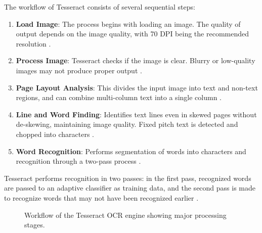 The workflow of Tesseract consists of several sequential steps:
\begin{enumerate}
	\item \textbf{Load Image}: The process begins with loading an image. The quality of output depends on the image quality, with 70 DPI being the recommended resolution \cite {Joshi:2021}.
	\item \textbf{Process Image}: Tesseract checks if the image is clear. Blurry or low-quality images may not produce proper output \cite {Smith:1987, Joshi:2021}.
	\item \textbf{Page Layout Analysis}: This divides the input image into text and non-text regions, and can combine multi-column text into a single column \cite {Joshi:2021}.
	\item \textbf{Line and Word Finding}: Identifies text lines even in skewed pages without de-skewing, maintaining image quality. Fixed pitch text is detected and chopped into characters \cite {Joshi:2021}.
	\item \textbf{Word Recognition}: Performs segmentation of words into characters and recognition through a two-pass process \cite {Joshi:2021}.
\end{enumerate}

Tesseract performs recognition in two passes: in the first pass, recognized words are passed to an adaptive classifier as training data, and the second pass is made to recognize words that may not have been recognized earlier \cite {Joshi:2021}.


\begin{figure}[H]
	\centering
	\caption{Workflow of the Tesseract OCR engine showing major processing stages.}
	\label{fig:tesseract_workflow}
\end{figure}

